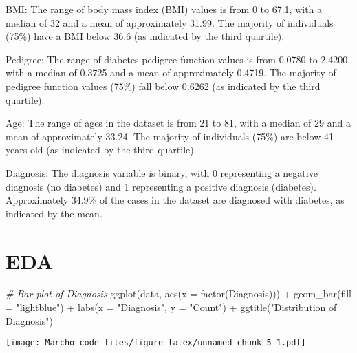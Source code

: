 \documentclass[
]{article}
\newenvironment{Shaded}{\begin{snugshade}}{\end{snugshade}}
\newcommand{\AttributeTok}[1]{\textcolor[rgb]{0.77,0.63,0.00}{#1}}
\newcommand{\CommentTok}[1]{\textcolor[rgb]{0.56,0.35,0.01}{\textit{#1}}}
\newcommand{\FunctionTok}[1]{\textcolor[rgb]{0.00,0.00,0.00}{#1}}
\newcommand{\NormalTok}[1]{#1}
\newcommand{\SpecialCharTok}[1]{\textcolor[rgb]{0.00,0.00,0.00}{#1}}
\newcommand{\StringTok}[1]{\textcolor[rgb]{0.31,0.60,0.02}{#1}}
\begin{document}
BMI: The range of body mass index (BMI) values is from 0 to 67.1, with a
median of 32 and a mean of approximately 31.99. The majority of
individuals (75\%) have a BMI below 36.6 (as indicated by the third
quartile).

Pedigree: The range of diabetes pedigree function values is from 0.0780
to 2.4200, with a median of 0.3725 and a mean of approximately 0.4719.
The majority of pedigree function values (75\%) fall below 0.6262 (as
indicated by the third quartile).

Age: The range of ages in the dataset is from 21 to 81, with a median of
29 and a mean of approximately 33.24. The majority of individuals (75\%)
are below 41 years old (as indicated by the third quartile).

Diagnosis: The diagnosis variable is binary, with 0 representing a
negative diagnosis (no diabetes) and 1 representing a positive diagnosis
(diabetes). Approximately 34.9\% of the cases in the dataset are
diagnosed with diabetes, as indicated by the mean.

\hypertarget{eda}{%
\section{EDA}\label{eda}}

\begin{Shaded}
\begin{Highlighting}[]
\CommentTok{\# Bar plot of Diagnosis}
\FunctionTok{ggplot}\NormalTok{(data, }\FunctionTok{aes}\NormalTok{(}\AttributeTok{x =} \FunctionTok{factor}\NormalTok{(Diagnosis))) }\SpecialCharTok{+}
  \FunctionTok{geom\_bar}\NormalTok{(}\AttributeTok{fill =} \StringTok{"lightblue"}\NormalTok{) }\SpecialCharTok{+}
  \FunctionTok{labs}\NormalTok{(}\AttributeTok{x =} \StringTok{"Diagnosis"}\NormalTok{, }\AttributeTok{y =} \StringTok{"Count"}\NormalTok{) }\SpecialCharTok{+}
  \FunctionTok{ggtitle}\NormalTok{(}\StringTok{"Distribution of Diagnosis"}\NormalTok{)}
\end{Highlighting}
\end{Shaded}

\texttt{[image: Marcho\_code\_files/figure-latex/unnamed-chunk-5-1.pdf]}
\end{document}
